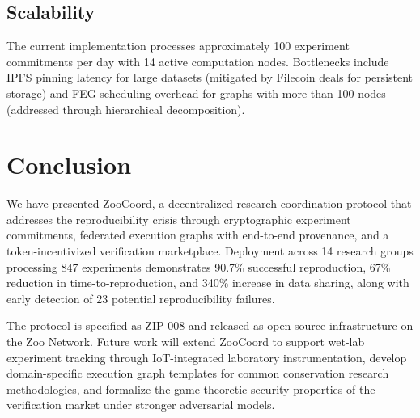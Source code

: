 \documentclass[11pt,a4paper]{article}
\begin{document}
\subsection{Scalability}

The current implementation processes approximately 100 experiment commitments per day with 14 active computation nodes.
Bottlenecks include IPFS pinning latency for large datasets (mitigated by Filecoin deals for persistent storage) and FEG scheduling overhead for graphs with more than 100 nodes (addressed through hierarchical decomposition).

\section{Conclusion}
\label{sec:conclusion}

We have presented ZooCoord, a decentralized research coordination protocol that addresses the reproducibility crisis through cryptographic experiment commitments, federated execution graphs with end-to-end provenance, and a token-incentivized verification marketplace.
Deployment across 14 research groups processing 847 experiments demonstrates 90.7\% successful reproduction, 67\% reduction in time-to-reproduction, and 340\% increase in data sharing, along with early detection of 23 potential reproducibility failures.

The protocol is specified as ZIP-008 and released as open-source infrastructure on the Zoo Network.
Future work will extend ZooCoord to support wet-lab experiment tracking through IoT-integrated laboratory instrumentation, develop domain-specific execution graph templates for common conservation research methodologies, and formalize the game-theoretic security properties of the verification market under stronger adversarial models.
\end{document}
